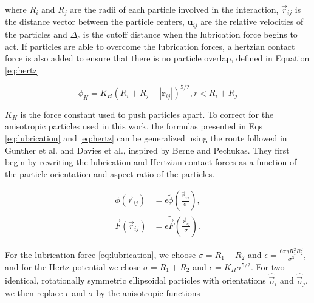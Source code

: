 where $R_i$ and $R_j$ are the radii of each particle involved in the interaction, $\vec{r}_{ij}$ is the distance
vector between the particle centers, $\mathbf{u}_{ij}$ are the relative velocities of the particles and $\Delta_c$ 
is the cutoff distance when the lubrication force begins to act. If particles are able to overcome the lubrication forces, 
a hertzian contact force is also added to ensure that there is no particle overlap, defined in Equation \eqref{eq:hertz}

\begin{equation}
    \phi_{H} = K_{H}(R_i + R_j - |\mathbf{r}_{ij}|)^{5/2}, r < R_i + R_j
    \label{eq:hertz}
\end{equation}

$K_H$ is the force constant used to push particles apart. To correct for the anisotropic particles used in this work, 
the formulas presented in Eqs \ref{eq:lubrication} and \ref{eq:hertz} can be generalized using the route followed 
in Gunther et al. and Davies et al., inspired by Berne and Pechukas. \cite{gunther_timescales_2014, davies_interface_2014} 
They first begin by rewriting the lubrication and Hertzian contact forces as a function of the particle orientation and 
aspect ratio of the particles.

\begin{equation}
    \begin{split}
    \phi(\vec{r}_{ij}) &= {\epsilon} \tilde{\phi}\left(\frac{\vec{r}_{ij}}{{\sigma}}\right) , \\
    \vec{F}(\vec{r}_{ij}) &= {\epsilon} \tilde{\vec{F}}\left(\frac{\vec{r}_{ij}}{{\sigma}}\right) .
    \end{split}
\end{equation}

For the lubrication force \eqref{eq:lubrication}, we choose
${\sigma}=R_1+R_2$ and ${\epsilon}=\frac{6\pi\eta R_1^2 R_2^2}{{\sigma^3}}$, and for the
Hertz potential we chose ${\sigma}=R_1+R_2$ and ${\epsilon}=K_H\sigma^{5/2}$. For two identical, rotationally
symmetric ellipsoidal particles with orientations $\hat{\vec{o}}_i$ and $\hat{\vec{o}}_j$, we then replace $\epsilon$ and $\sigma$ by
the anisotropic functions

